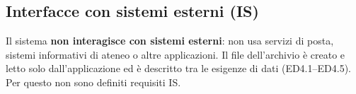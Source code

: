 \subsection{Interfacce con sistemi esterni (IS)}
Il sistema \textbf{non interagisce con sistemi esterni}: non usa servizi di posta, sistemi informativi di ateneo o altre applicazioni. Il file dell'archivio è creato e letto solo dall'applicazione ed è descritto tra le esigenze di dati (ED4.1–ED4.5). Per questo non sono definiti requisiti IS.
